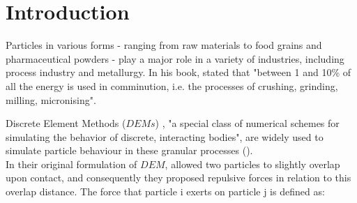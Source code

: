 
\part{Introduction}
\label{par:introduction}

Particles in various forms - ranging from raw materials to food grains and pharmaceutical powders - 
play a major role in a variety of industries, including process industry and metallurgy. 
In his book, \citet{RefWorks:117} stated that "between 1 and 10\% of all the energy is used in 
comminution, i.e. the processes of crushing, grinding, milling, micronising". 

Discrete Element Methods ($DEMs$) , "a special class of numerical schemes for
simulating the behavior of discrete, interacting bodies", are widely used to 
simulate particle behaviour in these granular processes
(\citet{RefWorks:130}).\\
In their original formulation of $DEM$, \citet{RefWorks:172} allowed two 
particles to slightly overlap upon contact, and consequently they proposed
repulsive forces in relation to this overlap distance.
The force that particle i exerts on particle j is defined as:


%

